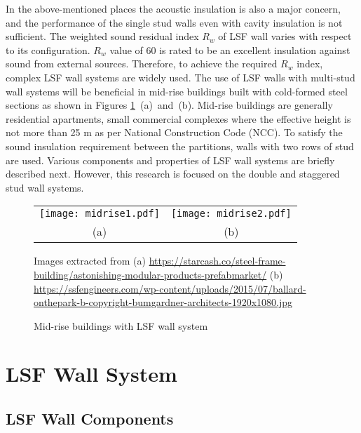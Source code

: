 In the above-mentioned places the acoustic insulation is also a major concern, and the performance of the single stud walls even with cavity insulation is not sufficient. The weighted sound residual index $R_w$ of LSF wall varies with respect to its configuration. $R_w$ value of 60 is rated to be an excellent insulation against sound from external sources. Therefore, to achieve the required $R_w$ index, complex LSF wall systems are widely used. The use of LSF walls with multi-stud wall systems will be beneficial in mid-rise buildings built with cold-formed steel sections as shown in Figures \ref{fig:midrise}~(a)~and~(b). Mid-rise buildings are generally residential apartments, small commercial complexes where the effective height is not more than 25 m as per National Construction Code (NCC). To satisfy the sound insulation requirement between the partitions, walls with two rows of stud are used. Various components and properties of LSF wall systems are briefly described next. However, this research is focused on the double and staggered stud wall systems.
	 
\begin{figure}[htbp]
	\centering	
		\begin{tabular}{cc}
			\texttt{[image: midrise1.pdf]} &
			\texttt{[image: midrise2.pdf]} \\
			(a) &
			(b) \\
		\end{tabular}
		\begin{scriptsize}
			Images extracted from (a) \url{https://starcash.co/steel-frame-building/astonishing-modular-products-prefabmarket/} (b) \url{https://ssfengineers.com/wp-content/uploads/2015/07/ballard-onthepark-b-copyright-bumgardner-architects-1920x1080.jpg}
			\end{scriptsize}	
		\caption{Mid-rise buildings with LSF wall system}
		\label{fig:midrise}
\end{figure}

\section{LSF Wall System}
\subsection{LSF Wall Components}

